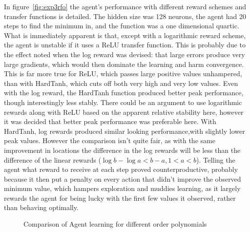 In figure~\ref{fig:exp3rfo} the agent's performance with different reward schemes and transfer functions is detailed. The hidden size was 128 neurons, the agent had 20 steps to find the minimum in, and the function was a one dimensional quartic.  What is immediately apparent is that, except with a logarithmic reward scheme, the agent is unstable if it uses a ReLU transfer function. This is probably due to the effect noted when the log reward was devised: that large errors produce very large gradients, which would then dominate the learning and harm convergence. This is far more true for ReLU, which passes large positive values unhampered, than with HardTanh, which cuts off both very high and very low values. Even with the log reward, the HardTanh function produced better peak performance, though interestingly less stably. There could be an argument to use logarithmic rewards along with ReLU based on the apparent relative stability here, however it was decided that better peak performance was preferable here. With HardTanh, log rewards produced similar looking performance,with slightly lower peak values. However the comparison isn't quite fair, as with the same improvement in locations the difference in the log rewards will be less than the difference of the linear rewards ($\log b - \log a < b - a, 1 < a < b $). Telling the agent what reward to receive at each step proved counterproductive, probably because it then put a penalty on every action that didn't improve the observed minimum value, which hampers exploration and muddies learning, as it largely rewards the agent for being lucky with the first few values it observed, rather than behaving optimally.

\begin{figure}
\centering

\caption{Comparison of Agent learning for different order polynomials}
\label{fig:exp2parrfo}
\end{figure}

